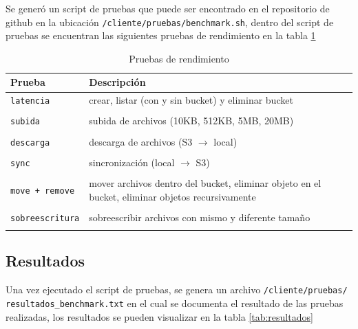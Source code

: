 \documentclass[12pt, letterpaper]{article}
\begin{document}
Se generó un script de pruebas que puede ser encontrado en el repositorio de github en la ubicación \texttt{/cliente/pruebas/benchmark.sh}, dentro del script de pruebas se encuentran las siguientes pruebas de rendimiento en la tabla \ref{tab:pruebas}

\begin{table}[h]
\caption{Pruebas de rendimiento}
\label{tab:pruebas}
\centering
\begin{tabular}{p{3cm}p{10cm}}
\toprule
\textbf{Prueba} & \textbf{Descripción} \\
\midrule
\texttt{latencia}        & crear, listar (con y sin bucket) y eliminar bucket \\ \\
\texttt{subida}          & subida de archivos (10KB, 512KB, 5MB, 20MB) \\ \\
\texttt{descarga}        & descarga de archivos (S3 $\to$ local) \\ \\
\texttt{sync}            & sincronización (local $\to$ S3) \\ \\
\texttt{move + remove}   & mover archivos dentro del bucket, eliminar objeto en el bucket, eliminar objetos recursivamente \\ \\
\texttt{sobreescritura}  & sobreescribir archivos con mismo y diferente tamaño \\ \\
\bottomrule
\end{tabular}
\end{table}

\subsection{Resultados}
Una vez ejecutado el script de pruebas, se genera un archivo \texttt{/cliente/pruebas/} \texttt{resultados\_benchmark.txt} en el cual se documenta el resultado de las pruebas realizadas, los resultados se pueden visualizar en la tabla \ref{tab:resultados} 
\end{document}
